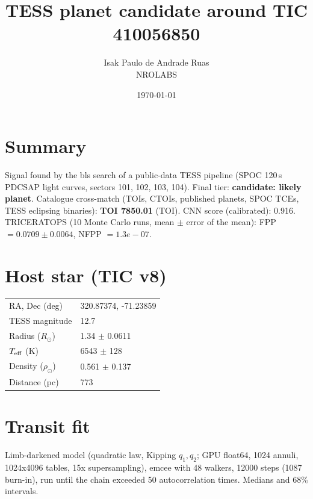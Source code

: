 \documentclass[11pt,a4paper]{article}
\title{TESS planet candidate around TIC 410056850}
\author{Isak Paulo de Andrade Ruas \\ NROLABS}
\date{\today}
\begin{document}
\maketitle

\section*{Summary}
Signal found by the bls search of a public-data TESS pipeline
(SPOC 120\,s PDCSAP light curves, sectors 101, 102, 103, 104).
Final tier: \textbf{candidate: likely planet}.
Catalogue cross-match (TOIs, CTOIs, published planets, SPOC TCEs, TESS eclipsing binaries):
\textbf{TOI 7850.01} (TOI).
CNN score (calibrated): 0.916.
TRICERATOPS (10 Monte Carlo runs, mean $\pm$ error of the mean):
FPP $= 0.0709 \pm 0.0064$,
NFPP $= 1.3e-07$.

\section*{Host star (TIC v8)}
\begin{tabular}{ll}\toprule
RA, Dec (deg) & 320.87374, -71.23859 \\
TESS magnitude & 12.7 \\
Radius ($R_\odot$) & 1.34 $\pm$ 0.0611 \\
$T_{\rm eff}$ (K) & 6543 $\pm$ 128 \\
Density ($\rho_\odot$) & 0.561 $\pm$ 0.137 \\
Distance (pc) & 773 \\\bottomrule
\end{tabular}

\section*{Transit fit}
Limb-darkened model (quadratic law, Kipping $q_1,q_2$; GPU float64, 1024 annuli, 1024x4096 tables, 15x supersampling), emcee with 48 walkers,
12000 steps (1087 burn-in), run until the chain exceeded 50 autocorrelation times.
Medians and 68\% intervals.
\end{document}
